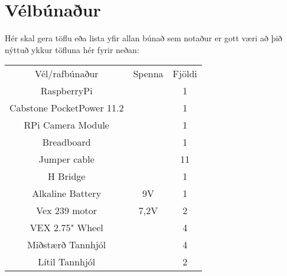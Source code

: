 \section{Vélbúnaður}
Hér skal gera töflu eða lista yfir allan búnað sem notaður er gott væri að þið nýttuð ykkur töfluna hér fyrir neðan:

\begin{center}
\begin{tabular}{ |c|c|c| } 
 \hline
 Vél/rafbúnaður &Spenna &Fjöldi\\ 
 RaspberryPi & & 1 \\ 
Cabstone PocketPower 11.2 & & 1\\
 RPi Camera Module & & 1 \\
 Breadboard & & 1 \\
 Jumper cable & & 11 \\
 H Bridge & & 1 \\
 Alkaline Battery & 9V & 1 \\
 Vex 239 motor & 7,2V & 2 \\
 VEX 2.75" Wheel & & 4 \\
 Miðstærð Tannhjól & & 4 \\
 Lítil Tannhjól & & 2 \\
 \hline
\end{tabular}
\end{center}